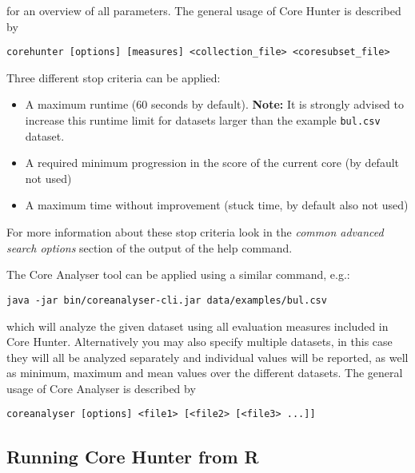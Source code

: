 \documentclass[a4paper, titlepage, 11pt]{article}
\begin{document}
for an overview of all parameters. The general usage of Core Hunter is described by
\small
\begin{verbatim}
corehunter [options] [measures] <collection_file> <coresubset_file>
\end{verbatim}
\normalsize

Three different stop criteria can be applied:
\begin{itemize}
	\item A maximum runtime (60 seconds by default). \textbf{Note:} It is strongly advised to increase this runtime limit for datasets larger than the example \texttt{bul.csv} dataset.
	\item A required minimum progression in the score of the current core (by default not used)
	\item A maximum time without improvement (stuck time, by default also not used)
\end{itemize}
For more information about these stop criteria look in the \emph{common advanced search options} section of the output of the help command.

The Core Analyser tool can be applied using a similar command, e.g.:
\small
\begin{verbatim}
java -jar bin/coreanalyser-cli.jar data/examples/bul.csv
\end{verbatim}
\normalsize
which will analyze the given dataset using all evaluation measures included in Core Hunter. Alternatively you may also specify multiple datasets, in this case they will all be analyzed separately and individual values will be reported, as well as minimum, maximum and mean values over the different datasets. The general usage of Core Analyser is described by
\small
\begin{verbatim}
coreanalyser [options] <file1> [<file2> [<file3> ...]]
\end{verbatim}
\normalsize

\subsection{Running Core Hunter from R}
\end{document}

